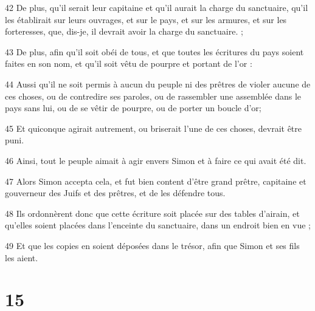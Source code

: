 \par 42 De plus, qu'il serait leur capitaine et qu'il aurait la charge du sanctuaire, qu'il les établirait sur leurs ouvrages, et sur le pays, et sur les armures, et sur les forteresses, que, dis-je, il devrait avoir la charge du sanctuaire. ;
\par 43 De plus, afin qu'il soit obéi de tous, et que toutes les écritures du pays soient faites en son nom, et qu'il soit vêtu de pourpre et portant de l'or :
\par 44 Aussi qu'il ne soit permis à aucun du peuple ni des prêtres de violer aucune de ces choses, ou de contredire ses paroles, ou de rassembler une assemblée dans le pays sans lui, ou de se vêtir de pourpre, ou de porter un boucle d'or;
\par 45 Et quiconque agirait autrement, ou briserait l'une de ces choses, devrait être puni.
\par 46 Ainsi, tout le peuple aimait à agir envers Simon et à faire ce qui avait été dit.
\par 47 Alors Simon accepta cela, et fut bien content d'être grand prêtre, capitaine et gouverneur des Juifs et des prêtres, et de les défendre tous.
\par 48 Ils ordonnèrent donc que cette écriture soit placée sur des tables d'airain, et qu'elles soient placées dans l'enceinte du sanctuaire, dans un endroit bien en vue ;
\par 49 Et que les copies en soient déposées dans le trésor, afin que Simon et ses fils les aient.

\chapter{15}

